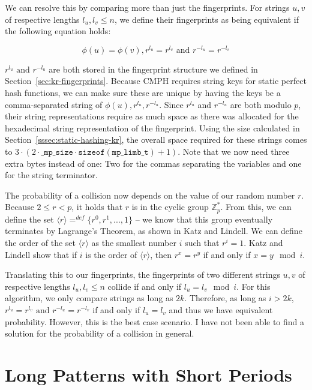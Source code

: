 \documentclass[ %
                    author={Dominic Joseph Moylett},
                    degree={MEng},
                     title={Dictionary Matching with Fingerprints},
                  subtitle={An Empirical Analysis},
                      type={research},
                      year={2015} ]{dissertation}
\begin{document}
We can resolve this by comparing more than just the fingerprints. For strings $u, v$ of respective lengths $l_u, l_v \leq n$, we define their fingerprints as being equivalent if the following equation holds:

$$\phi(u) = \phi(v), r^{l_u} = r^{l_v} \text{ and } r^{-l_u} = r^{-l_v}$$

$r^{l_u} \text{ and } r^{-l_u}$ are both stored in the fingerprint structure we defined in Section~\ref{sec:kr-fingerprints}. Because CMPH requires string keys for static perfect hash functions, we can make sure these are unique by having the keys be a comma-separated string of $\phi(u),r^{l_u},r^{-l_u}$. Since $r^{l_u}$ and $r^{-l_u}$ are both modulo $p$, their string representations require as much space as there was allocated for the hexadecimal string representation of the fingerprint. Using the size calculated in Section~\ref{sssec:static-hashing-kr}, the overall space required for these strings comes to $3 \cdot (2 \cdot \texttt{\_mp\_size} \cdot \texttt{sizeof}(\texttt{mp\_limb\_t}) + 1)$. Note that we now need three extra bytes instead of one: Two for the commas separating the variables and one for the string terminator.

The probability of a collision now depends on the value of our random number $r$. Because $2 \leq r < p$, it holds that $r$ is in the cyclic group $\mathbb{Z}^*_p$. From this, we can define the set $\langle r \rangle =^{def} \{r^0, r^1,...,1\}$ -- we know that this group eventually terminates by Lagrange's Theorem, as shown in Katz and Lindell\cite{katz:lagrange}. We can define the order of the set $\langle r \rangle$ as the smallest number $i$ such that $r^i = 1$. Katz and Lindell\cite{katz:cyclic-groups} show that if $i$ is the order of $\langle r \rangle$, then $r^x = r^y$ if and only if $x = y \mod i$.

Translating this to our fingerprints, the fingerprints of two different strings $u, v$ of respective lengths $l_u, l_v \leq n$ collide if and only if $l_u = l_v \mod i$. For this algorithm, we only compare strings as long as $2k$. Therefore, as long as $i > 2k$, $r^{l_u} = r^{l_v} \text{ and } r^{-l_u} = r^{-l_v}$ if and only if $l_u = l_v$ and thus we have equivalent probability. However, this is the best case scenario. I have not been able to find a solution for the probability of a collision in general.

\section{Long Patterns with Short Periods}
\label{sec:impl-periodic}
\end{document}
